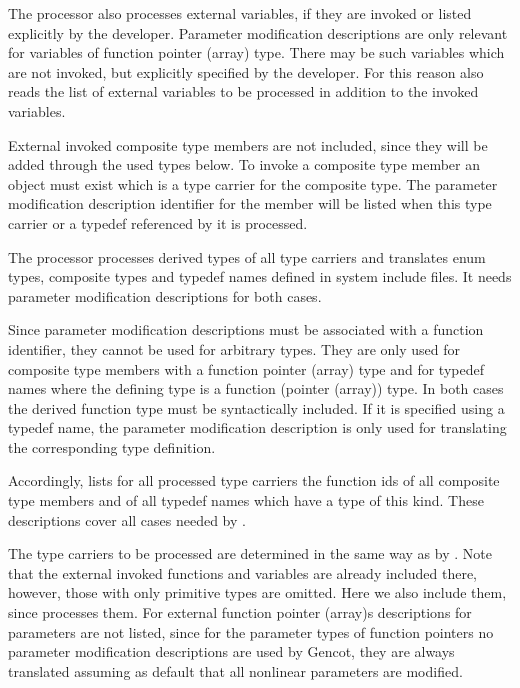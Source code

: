 The processor  also processes external variables, if they are invoked or listed explicitly
by the developer. Parameter modification descriptions are only relevant for variables of function pointer (array)
type. There may be such variables which are not invoked, but explicitly specified by the developer. For this
reason  also reads the list of external variables to be processed in addition to the
invoked variables.

External invoked composite type members are not included, since they will be added through the used types below. To invoke 
a composite type member an object must exist which is a type carrier for the composite type. The parameter modification
description identifier for the member will be listed when this type carrier or a typedef referenced by it
is processed.

The processor  processes derived types of all type carriers and translates enum types,
composite types and typedef names defined in system include files. It needs parameter modification descriptions
for both cases. 

Since parameter modification descriptions must be associated with a function identifier, they cannot be used
for arbitrary types. They are only used for composite type members with a function pointer (array) type and 
for typedef names where the defining type is a function (pointer (array)) type. In both cases the derived
function type must be syntactically included. If it is specified using a typedef name, the parameter modification
description is only used for translating the corresponding type definition.

Accordingly,  lists for all processed type carriers the function ids of all composite type
members and of all typedef names which have a type of this kind. These descriptions cover all cases needed
by .

The type carriers to be processed are determined in the same way as by . Note that the 
external invoked functions and variables are already included there, however, those with only primitive types are omitted.
Here we also include them, since  processes them. 
For external function pointer (array)s descriptions for parameters are not listed, since
for the parameter types of function pointers no parameter modification descriptions are used by Gencot, they
are always translated assuming as default that all nonlinear parameters are modified.


